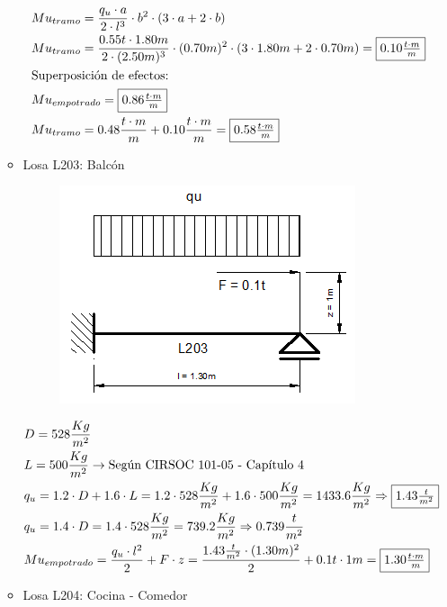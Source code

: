 \begin{enumerate}
\begin{itemize}
\begin{align*}
& Mu_{tramo} = \frac{q_u \cdot a}{2 \cdot l^3} \cdot b^2 \cdot (3 \cdot a+2 \cdot b)\\
& Mu_{tramo} = \frac{0.55t \cdot 1.80m}{2 \cdot (2.50m)^3} \cdot (0.70m)^2 \cdot (3 \cdot 1.80m + 2 \cdot 0.70m)=\framebox{$0.10 \frac{t \cdot m}{m}$}\\
& \text{Superposición de efectos:}\\
& Mu_{empotrado} = \framebox{$0.86 \frac{t \cdot m}{m}$}\\
& Mu_{tramo} = 0.48 \frac{t \cdot m}{m}+0.10 \frac{t \cdot m}{m} = \framebox{$0.58 \frac{t \cdot m}{m}$}
\end{align*}
\newpage
\item Losa L203: Balcón

\begin{figure}[H]
\begin{center}
     \includegraphics[scale = 0.8]{chapters/chapter_1/images/l203.png}
\end{center}
\end{figure}
\begin{align*}
& D = 528 \frac{Kg}{m^2}\\
& L = 500 \frac{Kg}{m^2} \rightarrow \text{Según CIRSOC 101-05 - Capítulo 4}\\
& q_u = 1.2 \cdot D + 1.6 \cdot L = 1.2 \cdot 528 \frac{Kg}{m^2} + 1.6 \cdot 500 \frac{Kg}{m^2} = 1433.6 \frac{Kg}{m^2} \Rightarrow \framebox{$1.43 \frac{t}{m^2}$} \\
& q_u = 1.4 \cdot D = 1.4 \cdot 528 \frac{Kg}{m^2} = 739.2 \frac{Kg}{m^2} \Rightarrow 0.739 \frac{t}{m^2}\\
& Mu_{empotrado} = \frac{q_u \cdot l^2}{2} + F \cdot z = \frac{1.43 \frac{t}{m^2} \cdot (1.30m)^2}{2} + 0.1t \cdot 1m = \framebox{$1.30 \frac{t \cdot m}{m}$}\\
\end{align*}
\newpage
\item Losa L204: Cocina - Comedor


\end{itemize}
\end{enumerate}
